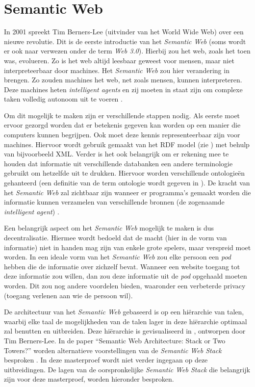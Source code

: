 \section{Semantic Web}
\label{sec:semantic_web}
In 2001 spreekt Tim Berners-Lee (uitvinder van het World Wide Web) over een nieuwe revolutie. Dit is de eerste introductie van het \textit{Semantic Web} (soms wordt er ook naar verwezen onder de term \textit{Web 3.0}). Hierbij zou het web, zoals het toen was, evolueren. Zo is het web altijd leesbaar geweest voor mensen, maar niet interpreteerbaar door machines. Het \textit{Semantic Web} zou hier verandering in brengen. Zo zouden machines het web, net zoals mensen, kunnen interpreteren. Deze machines heten \textit{intelligent agents} en zij moeten in staat zijn om complexe taken volledig autonoom uit te voeren \cite{berners2001semantic}.

Om dit mogelijk te maken zijn er verschillende stappen nodig. Als eerste moet ervoor gezorgd worden dat er betekenis gegeven kan worden op een manier die computers kunnen begrijpen. Ook moet deze kennis representeerbaar zijn voor machines. Hiervoor wordt gebruik gemaakt van het RDF model (zie ) met behulp van bijvoorbeeld XML. Verder is het ook belangrijk om er rekening mee te houden dat informatie uit verschillende databanken een andere terminologie gebruikt om hetzelfde uit te drukken. Hiervoor worden verschillende ontologieën gehanteerd (een definitie van de term ontologie wordt gegeven in ). De kracht van het \textit{Semantic Web} zal zichtbaar zijn wanneer er programma's gemaakt worden die informatie kunnen verzamelen van verschillende bronnen (de zogenaamde \textit{intelligent agent}) \cite{berners2001semantic}.

Een belangrijk aspect om het \textit{Semantic Web} mogelijk te maken is dus decentralisatie. Hiermee wordt bedoeld dat de macht (hier in de vorm van informatie) niet in handen mag zijn van enkele grote spelers, maar verspreid moet worden. In een ideale vorm van het \textit{Semantic Web} zou elke persoon een \textit{pod} hebben die de informatie over zichzelf bevat. Wanneer een website toegang tot deze informatie zou willen, dan zou deze informatie uit de \textit{pod} opgehaald moeten worden. Dit zou nog andere voordelen bieden, waaronder een verbeterde privacy (toegang verlenen aan wie de persoon wil).

De architectuur van het \textit{Semantic Web} gebaseerd is op een hiërarchie van talen, waarbij elke taal de mogelijkheden van de talen lager in deze hiërarchie optimaal zal benutten en uitbreiden. Deze hiërarchie is gevisualiseerd in , ontworpen door Tim Berners-Lee. In de paper ``Semantic Web Architecture: Stack or Two Towers?'' worden alternatieve voorstellingen van de \textit{Semantic Web Stack} besproken \cite{horrocks2005semantic}. In deze masterproef wordt niet verder ingegaan op deze uitbreidingen. De lagen van de oorspronkelijke \textit{Semantic Web Stack} die belangrijk zijn voor deze masterproef, worden hieronder besproken.

